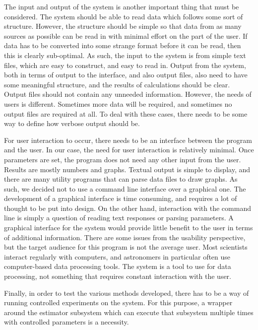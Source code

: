 \documentclass[a4paper,11pt]{article}
\begin{document}
   The input and output of the system is another important thing that must be
   considered. The system should be able to read data which follows some sort of
   structure. However, the structure should be simple so that data from as many
   sources as possible can be read in with minimal effort on the part of the
   user. If data has to be converted into some strange format before it can be
   read, then this is clearly sub-optimal. As such, the input to the system is
   from simple text files, which are easy to construct, and easy to read
   in. Output from the system, both in terms of output to the interface, and
   also output files, also need to have some meaningful structure, and the
   results of calculations should be clear. Output files should not contain any
   unneeded information. However, the needs of users is different. Sometimes
   more data will be required, and sometimes no output files are required at
   all. To deal with these cases, there needs to be some way to define how
   verbose output should be.

   For user interaction to occur, there needs to be an interface between the
   program and the user. In our case, the need for user interaction is
   relatively minimal. Once parameters are set, the program does not need any
   other input from the user. Results are mostly numbers and graphs. Textual
   output is simple to display, and there are many utility programs that can
   parse data files to draw graphs. As such, we decided not to use a command
   line interface over a graphical one. The development of a graphical interface
   is time consuming, and requires a lot of thought to be put into design. On
   the other hand, interaction with the command line is simply a question of
   reading text responses or parsing parameters. A graphical interface for the
   system would provide little benefit to the user in terms of additional
   information. There are some issues from the usability perspective, but the
   target audience for this program is not the average user. Most scientists
   interact regularly with computers, and astronomers in particular often use
   computer-based data processing tools. The system is a tool to use for data
   processing, not something that requires constant interaction with the
   user.

   Finally, in order to test the various methods developed, there has to be a
   way of running controlled experiments on the system. For this purpose, a
   wrapper around the estimator subsystem which can execute that subsystem
   multiple times with controlled parameters is a necessity.
\end{document}
